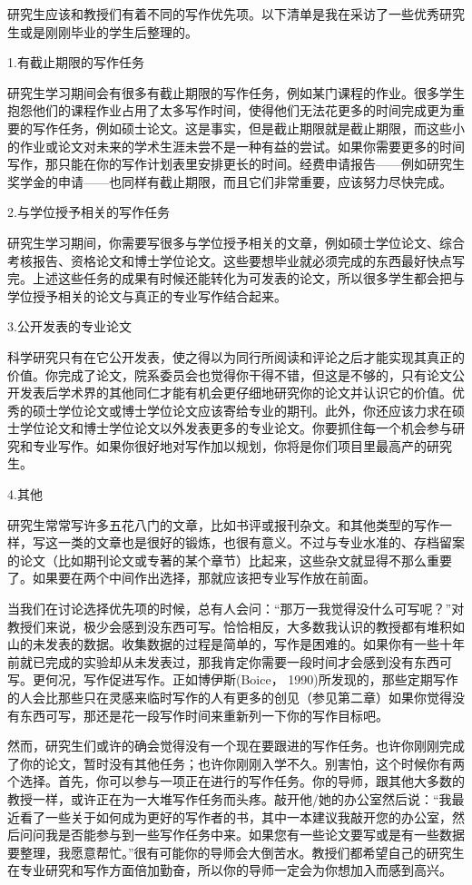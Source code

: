研究生应该和教授们有着不同的写作优先项。以下清单是我在采访了一些优秀研究生或是刚刚毕业的学生后整理的。

{\kaishu 1.有截止期限的写作任务}

研究生学习期间会有很多有截止期限的写作任务，例如某门课程的作业。很多学生抱怨他们的课程作业占用了太多写作时间，使得他们无法花更多的时间完成更为重要的写作任务，例如硕士论文。这是事实，但是截止期限就是截止期限，而这些小的作业或论文对未来的学术生涯未尝不是一种有益的尝试。如果你需要更多的时间写作，那只能在你的写作计划表里安排更长的时间。经费申请报告——例如研究生奖学金的申请——也同样有截止期限，而且它们非常重要，应该努力尽快完成。

{\kaishu 2.与学位授予相关的写作任务}

研究生学习期间，你需要写很多与学位授予相关的文章，例如硕士学位论文、综合考核报告、资格论文和博士学位论文。这些要想毕业就必须完成的东西最好快点写完。上述这些任务的成果有时候还能转化为可发表的论文，所以很多学生都会把与学位授予相关的论文与真正的专业写作结合起来。

{\kaishu 3.公开发表的专业论文}

科学研究只有在它公开发表，使之得以为同行所阅读和评论之后才能实现其真正的价值。你完成了论文，院系委员会也觉得你干得不错，但这是不够的，只有论文公开发表后学术界的其他同仁才能有机会更仔细地研究你的论文并认识它的价值。优秀的硕士学位论文或博士学位论文应该寄给专业的期刊。此外，你还应该力求在硕士学位论文和博士学位论文以外发表更多的专业论文。你要抓住每一个机会参与研究和专业写作。如果你很好地对写作加以规划，你将是你们项目里最高产的研究生。

{\kaishu 4.其他}

研究生常常写许多五花八门的文章，比如书评或报刊杂文。和其他类型的写作一样，写这一类的文章也是很好的锻炼，也很有意义。不过与专业水准的、存档留案的论文（比如期刊论文或专著的某个章节）比起来，这些杂文就显得不那么重要了。如果要在两个中间作出选择，那就应该把专业写作放在前面。

当我们在讨论选择优先项的时候，总有人会问：“那万一我觉得没什么可写呢？”对教授们来说，极少会感到没东西可写。恰恰相反，大多数我认识的教授都有堆积如山的未发表的数据。收集数据的过程是简单的，写作是困难的。如果你有一些十年前就已完成的实验却从未发表过，那我肯定你需要一段时间才会感到没有东西可写。更何况，写作促进写作。正如博伊斯(Boice， 1990)所发现的，那些定期写作的人会比那些只在灵感来临时写作的人有更多的创见（参见第二章）如果你觉得没有东西可写，那还是花一段写作时间来重新列一下你的写作目标吧。

然而，研究生们或许的确会觉得没有一个现在要跟进的写作任务。也许你刚刚完成了你的论文，暂时没有其他任务；也许你刚刚入学不久。别害怕，这个时候你有两个选择。首先，你可以参与一项正在进行的写作任务。你的导师，跟其他大多数的教授一样，或许正在为一大堆写作任务而头疼。敲开他/她的办公室然后说：“我最近看了一些关于如何成为更好的写作者的书，其中一本建议我敲开您的办公室，然后问问我是否能参与到一些写作任务中来。如果您有一些论文要写或是有一些数据要整理，我愿意帮忙。”很有可能你的导师会大倒苦水。教授们都希望自己的研究生在专业研究和写作方面倍加勤奋，所以你的导师一定会为你想加入而感到高兴。

